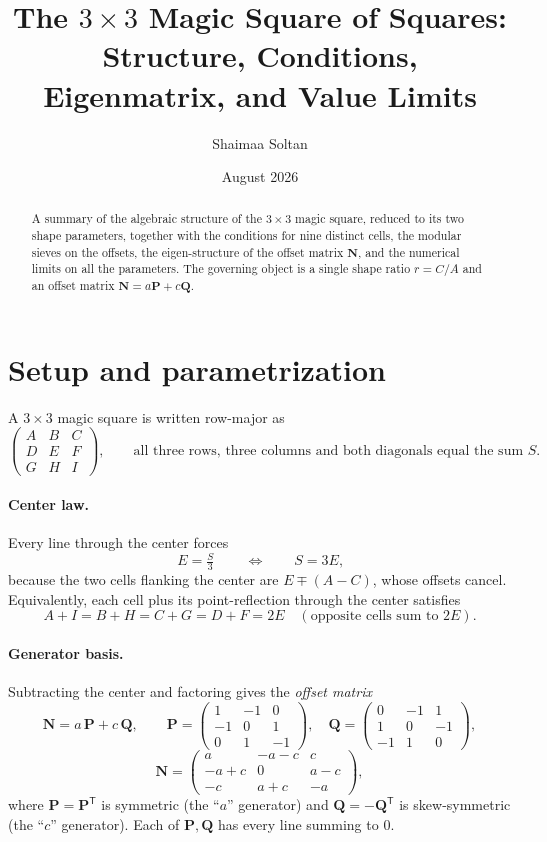 \documentclass[11pt]{article}
\title{The $3\times3$ Magic Square of Squares:\\ Structure, Conditions, Eigenmatrix, and Value Limits}
\author{Shaimaa Soltan}
\date{August 2026}
\newcommand{\N}{\mathbf{N}}
\newcommand{\PP}{\mathbf{P}}
\newcommand{\QQ}{\mathbf{Q}}
\begin{document}
\maketitle

\begin{abstract}
A summary of the algebraic structure of the $3\times3$ magic square, reduced to
its two shape parameters, together with the conditions for nine distinct cells,
the modular sieves on the offsets, the eigen-structure of the offset matrix
$\N$, and the numerical limits on all the parameters. The governing object is a
single shape ratio $r=C/A$ and an offset matrix $\N=a\PP+c\QQ$.
\end{abstract}

\section{Setup and parametrization}

A $3\times3$ magic square is written row-major as
\[
\begin{pmatrix} A & B & C\\ D & E & F\\ G & H & I\end{pmatrix},
\qquad
\text{all three rows, three columns and both diagonals equal the sum } S.
\]

\paragraph{Center law.} Every line through the center forces
\[
\boxed{\,E=\tfrac{S}{3}\,}\qquad\Longleftrightarrow\qquad S=3E,
\]
because the two cells flanking the center are $E\mp(A-C)$, whose offsets cancel.
Equivalently, each cell plus its point-reflection through the center satisfies
\[
A+I=B+H=C+G=D+F=2E \quad(\text{opposite cells sum to }2E).
\]

\paragraph{Generator basis.} Subtracting the center and factoring gives the
\emph{offset matrix}
\[
\N=a\,\PP+c\,\QQ,\qquad
\PP=\begin{pmatrix}1&-1&0\\-1&0&1\\0&1&-1\end{pmatrix},\quad
\QQ=\begin{pmatrix}0&-1&1\\1&0&-1\\-1&1&0\end{pmatrix},
\]
\[
\N=\begin{pmatrix} a & -a-c & c\\ -a+c & 0 & a-c\\ -c & a+c & -a\end{pmatrix},
\]
where $\PP=\PP^{\mathsf T}$ is symmetric (the ``$a$'' generator) and
$\QQ=-\QQ^{\mathsf T}$ is skew-symmetric (the ``$c$'' generator). Each of
$\PP,\QQ$ has every line summing to $0$.
\end{document}
